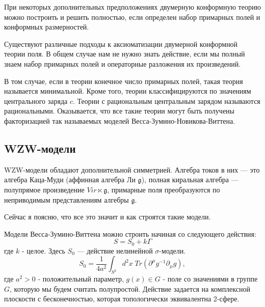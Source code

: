 При некоторых дополнительных предположениях двумерную конформную теорию можно построить и решить
полностью, если определен набор примарных полей и конформных размерностей. 

Существуют различные подходы к аксиоматизации двумерной конформной теории поля. В общем случае нам
не нужно знать действие, если мы полный знаем набор примарных полей и операторные разложения их
произведений. 

В том случае, если в теории конечное число примарных полей, такая теория называется минимальной.
Кроме того, теории классифицируются по значениям центрального заряда $c$. Теории с рациональным
центральным зарядом называются рациональными. Оказывается, что все такие теории могут быть получены
факторизацией так называемых моделей Весса-Зумино-Новикова-Виттена.

\subsection{WZW-модели}
\label{sec:wzw}

WZW-модели обладают дополнительной симметрией. Алгебра токов в них --- это алгебра Каца-Муди
(аффинная алгебра Ли $\mathfrak{g}$), полная киральная алгебра --- полупрямое произведение
$Vir\ltimes \mathfrak{g}$, примарные поля преобразуются по неприводимым представлениям алгебры $\mathfrak{g}$.

Сейчас я поясню, что все это значит и как строятся такие модели.

Модели Весса-Зумино-Виттена можно строить начиная со следующего действия:
\begin{equation}
\label{eq:4}
  S=S_0+k\Gamma
\end{equation}
где $k$ - целое.
Здесь $S_0$ --- действие нелинейной $\sigma$-модели.
\begin{equation}
  \label{eq:5}
  S_0=\frac{1}{4a^2}\int_{S^2} d^2x\; Tr (\partial^{\mu}g^{-1}\partial_{\mu}g),
\end{equation}
где $a^2>0$ - положительный параметр, $g(x)\in G$ - поле со значениями в группе $G$, которую мы
будем считать полупростой. Действие задается на комплексной плоскости с бесконечностью, которая
топологически эквивалентна 2-сфере.

